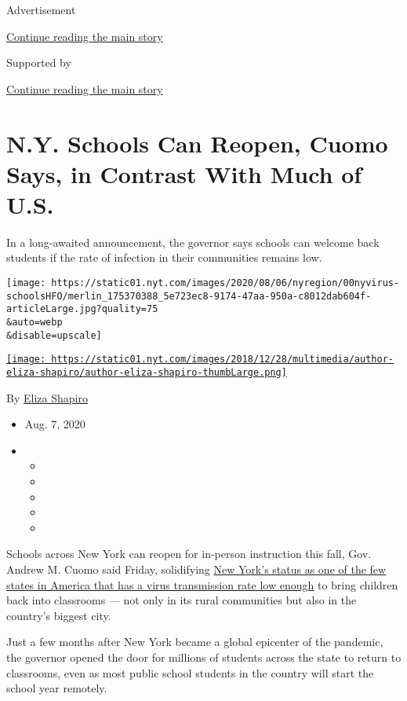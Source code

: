 Advertisement

\protect\hyperlink{after-top}{Continue reading the main story}

Supported by

\protect\hyperlink{after-sponsor}{Continue reading the main story}

\hypertarget{ny-schools-can-reopen-cuomo-says-in-contrast-with-much-of-us}{%
\section{N.Y. Schools Can Reopen, Cuomo Says, in Contrast With Much of
U.S.}\label{ny-schools-can-reopen-cuomo-says-in-contrast-with-much-of-us}}

In a long-awaited announcement, the governor says schools can welcome
back students if the rate of infection in their communities remains low.

\texttt{[image: https://static01.nyt.com/images/2020/08/06/nyregion/00nyvirus-schoolsHFO/merlin\_175370388\_5e723ec8-9174-47aa-950a-c8012dab604f-articleLarge.jpg?quality=75\\\&auto=webp\\\&disable=upscale]}

\href{https://www.nytimes.com/by/eliza-shapiro}{\texttt{[image: https://static01.nyt.com/images/2018/12/28/multimedia/author-eliza-shapiro/author-eliza-shapiro-thumbLarge.png]}}

By \href{https://www.nytimes.com/by/eliza-shapiro}{Eliza Shapiro}

\begin{itemize}
\item
  Aug. 7, 2020
\item
  \begin{itemize}
  \item
  \item
  \item
  \item
  \item
  \end{itemize}
\end{itemize}

Schools across New York can reopen for in-person instruction this fall,
Gov. Andrew M. Cuomo said Friday, solidifying
\href{https://www.nytimes.com/2020/08/05/nyregion/nyc-schools-reopening.html}{New
York's status as one of the few states in America that has a virus
transmission rate low enough} to bring children back into classrooms ---
not only in its rural communities but also in the country's biggest
city.

Just a few months after New York became a global epicenter of the
pandemic, the governor opened the door for millions of students across
the state to return to classrooms, even as most public school students
in the country will start the school year remotely.

